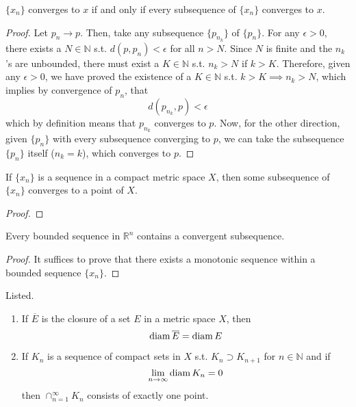   \begin{lemma}
    $\{x_n\}$ converges to $x$ if and only if every subsequence of $\{x_n\}$ converges to $x$. 
  \end{lemma}
  \begin{proof}
    Let $p_n \rightarrow p$. Then, take any subsequence $\{p_{n_k}\}$ of $\{p_n\}$. For any $\epsilon > 0$, there exists a $N \in \mathbb{N}$ s.t. $d(p, p_n) < \epsilon$ for all $n > N$. Since $N$ is finite and the $n_k$'s are unbounded, there must exist a $K \in \mathbb{N}$ s.t. $n_k > N$ if $k > K$. Therefore, given any $\epsilon > 0$, we have proved the existence of a $K \in \mathbb{N}$ s.t. $k > K \implies n_k > N$, which implies by convergence of $p_n$, that 
    \begin{equation}
      d(p_{n_k}, p) < \epsilon
    \end{equation}
    which by definition means that $p_{n_k}$ converges to $p$. Now, for the other direction, given $\{p_n\}$ with every subsequence converging to $p$, we can take the subsequence $\{p_n\}$ itself ($n_k = k$), which converges to $p$. 
  \end{proof}

  \begin{theorem}
    If $\{x_n\}$ is a sequence in a compact metric space $X$, then some subsequence of $\{x_n\}$ converges to a point of $X$.  
  \end{theorem}
  \begin{proof}
    
  \end{proof}

  \begin{corollary}
    Every bounded sequence in $\mathbb{R}^n$ contains a convergent subsequence. 
  \end{corollary} 
  \begin{proof}
    It suffices to prove that there exists a monotonic sequence within a bounded sequence $\{x_n\}$. 
  \end{proof}

  \begin{theorem}
    Listed. 
    \begin{enumerate}
      \item If $\overline{E}$ is the closure of a set $E$ in a metric space $X$, then 
      \[\operatorname{diam}{\overline{E}} = \operatorname{diam}{E}\]

      \item If $K_n$ is a sequence of compact sets in $X$ s.t. $K_n \supset K_{n+1}$ for $n \in \mathbb{N}$ and if 
      \[\lim_{n \rightarrow \infty} \operatorname{diam}{K_n} = 0\]
      then $\cap_{n=1}^\infty K_n$ consists of exactly one point. 
    \end{enumerate}
  \end{theorem}

